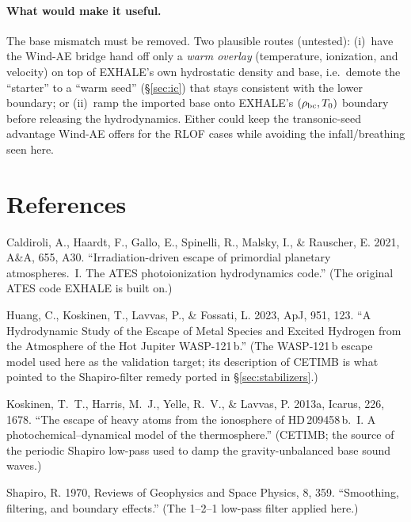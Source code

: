 \documentclass[english,a4paper]{my_memo}
\begin{document}
\paragraph{What would make it useful.} The base mismatch must be removed. Two
plausible routes (untested): (i)~have the Wind-AE bridge hand off only a
\emph{warm overlay} (temperature, ionization, and velocity) on top of
EXHALE's own hydrostatic density and base, i.e.\ demote the ``starter'' to a
``warm seed'' (\S\ref{sec:ic}) that stays consistent with the lower boundary;
or (ii)~ramp the imported base onto EXHALE's $(\rho_{\rm bc}, T_0)$ boundary
before releasing the hydrodynamics. Either could keep the transonic-seed
advantage Wind-AE offers for the RLOF cases while avoiding the infall/breathing
seen here.

\section*{References}
\begingroup
\setlength{\parindent}{0pt}%
\setlength{\parskip}{4pt}%

Caldiroli, A., Haardt, F., Gallo, E., Spinelli, R., Malsky, I., \& Rauscher, E.
2021, A\&A, 655, A30. ``Irradiation-driven escape of primordial planetary
atmospheres.~I. The ATES photoionization hydrodynamics code.'' (The original
ATES code EXHALE is built on.)

Huang, C., Koskinen, T., Lavvas, P., \& Fossati, L. 2023, ApJ, 951, 123. ``A
Hydrodynamic Study of the Escape of Metal Species and Excited Hydrogen from the
Atmosphere of the Hot Jupiter WASP-121\,b.'' (The WASP-121\,b escape model used
here as the validation target; its description of CETIMB is what pointed to the
Shapiro-filter remedy ported in \S\ref{sec:stabilizers}.)

Koskinen, T.~T., Harris, M.~J., Yelle, R.~V., \& Lavvas, P. 2013a, Icarus, 226,
1678. ``The escape of heavy atoms from the ionosphere of HD\,209458\,b.~I. A
photochemical--dynamical model of the thermosphere.'' (CETIMB; the source of the
periodic Shapiro low-pass used to damp the gravity-unbalanced base sound waves.)

Shapiro, R. 1970, Reviews of Geophysics and Space Physics, 8, 359.
``Smoothing, filtering, and boundary effects.'' (The 1--2--1 low-pass filter
applied here.)
\endgroup
\end{document}
